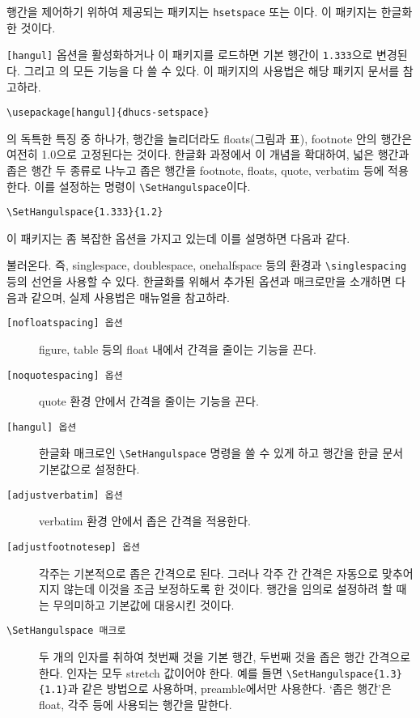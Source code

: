 행간을 제어하기 위하여 제공되는 패키지는 \texttt{hsetspace} 또는
이다. 이 패키지는 \를
한글화한 것이다. 

\texttt{[hangul]} 옵션을 활성화하거나 이 패키지를 로드하면
기본 행간이 \texttt{1.333}으로 변경된다. 그리고 의
모든 기능을 다 쓸 수 있다. 이 패키지의 사용법은 해당 패키지 문서를
참고하라. 
\begin{verbatim}
\usepackage[hangul]{dhucs-setspace}
\end{verbatim}

의 독특한 특징 중 하나가, 행간을 늘리더라도 
floats(그림과 표), footnote 안의 행간은 여전히 1.0으로 고정된다는
것이다. 한글화 과정에서 이 개념을 확대하여, 넓은 행간과 좁은 행간
두 종류로 나누고 좁은 행간을 footnote, floats, quote, verbatim
등에 적용한다. 이를 설정하는 명령이 \verb|\SetHangulspace|이다.
\begin{verbatim}
\SetHangulspace{1.333}{1.2}
\end{verbatim}

이 패키지는 좀 복잡한 옵션을 가지고 있는데 이를 설명하면 다음과 같다.

\와 \는 \를 불러온다.
즉, singlespace, doublespace, onehalfspace 등의
환경과 \texttt{\textbackslash singlespacing} 등의 선언을
사용할 수 있다.
한글화를 위해서 추가된 옵션과 매크로만을 소개하면
다음과 같으며, 실제 사용법은  매뉴얼을 참고하라.
\begin{description}
\item[\texttt{[nofloatspacing] 옵션}]
 figure, table 등의 float 내에서 간격을 줄이는 기능을 끈다.
\item[\texttt{[noquotespacing] 옵션}]
 quote 환경 안에서 간격을 줄이는 기능을 끈다.
\item[\texttt{[hangul] 옵션}]
 한글화 매크로인 \verb|\SetHangulspace| 명령을 쓸 수 있게 하고
 행간을 한글 문서 기본값으로 설정한다.
\item[\texttt{[adjustverbatim] 옵션}]
 verbatim 환경 안에서 좁은 간격을 적용한다.
\item[\texttt{[adjustfootnotesep] 옵션}]
 각주는 기본적으로 좁은 간격으로 된다. 그러나 각주 간 간격은 자동으로
 맞추어지지 않는데 이것을 조금 보정하도록 한 것이다. 행간을 임의로
 설정하려 할 때는 무의미하고 기본값에 대응시킨 것이다.
\item[\texttt{\textbackslash SetHangulspace 매크로}]
 두 개의 인자를 취하여 첫번째 것을 기본 행간, 두번째 것을
 좁은 행간 간격으로 한다. 인자는 모두 stretch 값이어야 한다.
 예를 들면 \verb|\SetHangulspace{1.3}{1.1}|과 같은
 방법으로 사용하며, preamble에서만 사용한다. `좁은 행간'은 float,
 각주 등에 사용되는 행간을 말한다.
\end{description}


